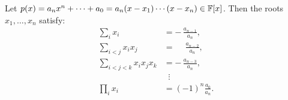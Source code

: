 \begin{thmbox}
Let $p(x) = a_n x^n + \cdots + a_0 = a_n(x-x_1)\cdots(x-x_n)\in\mathbb{F}[x]$.
Then the roots $x_1,\ldots,x_n$ satisfy:
\begin{align*}
    \sum_{i} x_i
        &= -\,\frac{a_{n-1}}{a_n}, \\
    \sum_{i<j} x_i x_j
        &= \phantom{-}\frac{a_{n-2}}{a_n}, \\
    \sum_{i<j<k} x_i x_j x_k
        &= -\,\frac{a_{n-3}}{a_n}, \\
        &\;\;\vdots \\
    \prod_{i} x_i
        &= (-1)^n\frac{a_0}{a_n}.
\end{align*}
\end{thmbox}
